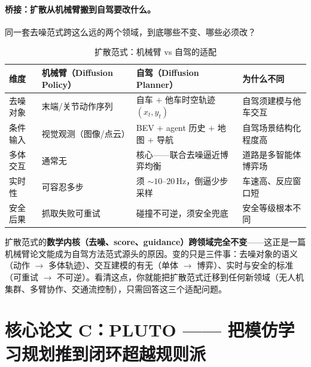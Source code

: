 \paragraph{桥接：扩散从机械臂搬到自驾要改什么。}
同一套去噪范式跨这么远的两个领域，到底哪些不变、哪些必须改？

\begin{table}[H]\centering\small
\caption{扩散范式：机械臂 vs 自驾的适配}
\label{tab:de-arm-vs-av}
\begin{tabular}{p{} p{} p{} p{}}
\toprule
维度 & 机械臂（Diffusion Policy） & 自驾（Diffusion Planner） & 为什么不同 \\
\midrule
去噪对象 & 末端/关节动作序列 & 自车 $+$ 他车时空轨迹 $(x_t,y_t)$ & 自驾须建模与他车交互 \\
条件输入 & 视觉观测（图像/点云） & BEV $+$ agent 历史 $+$ 地图 $+$ 导航 & 自驾场景结构化程度高 \\
多体交互 & 通常无 & 核心——联合去噪逼近博弈均衡 & 道路是多智能体博弈场 \\
实时性 & 可容忍多步 & 须 $\sim 10$--$20$\,Hz，倒逼少步采样 & 车速高、反应窗口短 \\
安全后果 & 抓取失败可重试 & 碰撞不可逆，须安全兜底 & 安全等级根本不同 \\
\bottomrule
\end{tabular}
\end{table}

\begin{insight}
扩散范式的\textbf{数学内核（去噪、score、guidance）跨领域完全不变}——这正是一篇机械臂论文能成为自驾方法范式源头的原因。变的只是三件事：去噪对象的语义（动作 $\to$ 多体轨迹）、交互建模的有无（单体 $\to$ 博弈）、实时与安全的标准（可重试 $\to$ 不可逆）。看清这点，你就能把扩散范式迁移到任何新领域（无人机集群、多臂协作、交通流控制），只需回答这三个适配问题。
\end{insight}

\section{核心论文 C：PLUTO —— 把模仿学习规划推到闭环超越规则派}
\label{sec:de-pluto}

